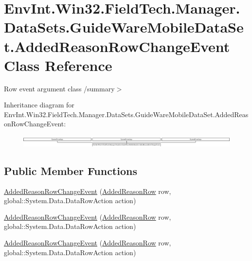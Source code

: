 \hypertarget{class_env_int_1_1_win32_1_1_field_tech_1_1_manager_1_1_data_sets_1_1_guide_ware_mobile_data_set_03c6c2b8486bc739eb1146c140ad3745}{}\section{Env\+Int.\+Win32.\+Field\+Tech.\+Manager.\+Data\+Sets.\+Guide\+Ware\+Mobile\+Data\+Set.\+Added\+Reason\+Row\+Change\+Event Class Reference}
\label{class_env_int_1_1_win32_1_1_field_tech_1_1_manager_1_1_data_sets_1_1_guide_ware_mobile_data_set_03c6c2b8486bc739eb1146c140ad3745}


Row event argument class /summary$>$  


Inheritance diagram for Env\+Int.\+Win32.\+Field\+Tech.\+Manager.\+Data\+Sets.\+Guide\+Ware\+Mobile\+Data\+Set.\+Added\+Reason\+Row\+Change\+Event\+:\begin{figure}[H]
\begin{center}
\leavevmode
\includegraphics[height=0.627451cm]{class_env_int_1_1_win32_1_1_field_tech_1_1_manager_1_1_data_sets_1_1_guide_ware_mobile_data_set_03c6c2b8486bc739eb1146c140ad3745}
\end{center}
\end{figure}
\subsection*{Public Member Functions}
\begin{DoxyCompactItemize}
\item 
\hyperlink{class_env_int_1_1_win32_1_1_field_tech_1_1_manager_1_1_data_sets_1_1_guide_ware_mobile_data_set_03c6c2b8486bc739eb1146c140ad3745_aa53f77b5ea86b79fedb970f33a1909f9}{Added\+Reason\+Row\+Change\+Event} (\hyperlink{class_env_int_1_1_win32_1_1_field_tech_1_1_manager_1_1_data_sets_1_1_guide_ware_mobile_data_set_1_1_added_reason_row}{Added\+Reason\+Row} row, global\+::\+System.\+Data.\+Data\+Row\+Action action)
\item 
\hyperlink{class_env_int_1_1_win32_1_1_field_tech_1_1_manager_1_1_data_sets_1_1_guide_ware_mobile_data_set_03c6c2b8486bc739eb1146c140ad3745_aa53f77b5ea86b79fedb970f33a1909f9}{Added\+Reason\+Row\+Change\+Event} (\hyperlink{class_env_int_1_1_win32_1_1_field_tech_1_1_manager_1_1_data_sets_1_1_guide_ware_mobile_data_set_1_1_added_reason_row}{Added\+Reason\+Row} row, global\+::\+System.\+Data.\+Data\+Row\+Action action)
\item 
\hyperlink{class_env_int_1_1_win32_1_1_field_tech_1_1_manager_1_1_data_sets_1_1_guide_ware_mobile_data_set_03c6c2b8486bc739eb1146c140ad3745_aa53f77b5ea86b79fedb970f33a1909f9}{Added\+Reason\+Row\+Change\+Event} (\hyperlink{class_env_int_1_1_win32_1_1_field_tech_1_1_manager_1_1_data_sets_1_1_guide_ware_mobile_data_set_1_1_added_reason_row}{Added\+Reason\+Row} row, global\+::\+System.\+Data.\+Data\+Row\+Action action)
\end{DoxyCompactItemize}
